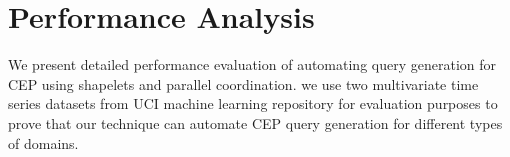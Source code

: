 \documentclass[conference]{IEEEtran}  %
\begin{document}
\section{Performance Analysis}
We present detailed performance evaluation of automating query generation for CEP using shapelets and parallel coordination.
we use two multivariate time series datasets from UCI machine learning repository \cite{IEEEexample:Ocupancy,IEEEexample:EEG} for evaluation purposes to prove that our technique can automate CEP query generation for different types of domains.


\end{document}
